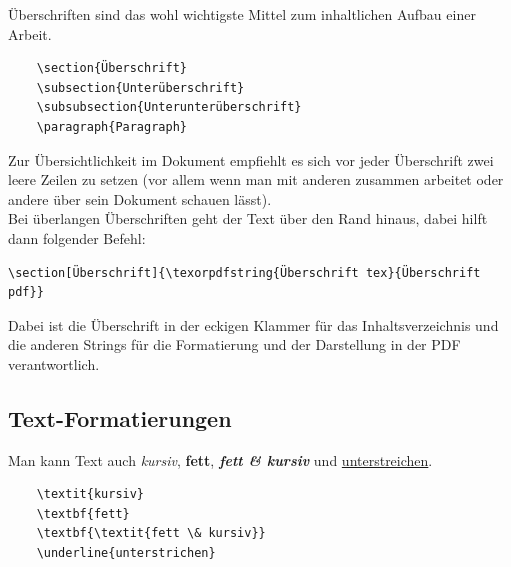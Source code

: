 Überschriften sind das wohl wichtigste Mittel zum inhaltlichen Aufbau einer Arbeit.

\begin{verbatim}
    \section{Überschrift}
    \subsection{Unterüberschrift}
    \subsubsection{Unterunterüberschrift}
    \paragraph{Paragraph}
\end{verbatim}

Zur Übersichtlichkeit im Dokument empfiehlt es sich vor jeder Überschrift zwei leere Zeilen zu setzen (vor allem wenn man mit anderen zusammen arbeitet oder andere über sein Dokument schauen lässt).\\

Bei überlangen Überschriften geht der Text über den Rand hinaus, dabei hilft dann folgender Befehl:

\begin{verbatim}
\section[Überschrift]{\texorpdfstring{Überschrift tex}{Überschrift pdf}}
\end{verbatim}

Dabei ist die Überschrift in der eckigen Klammer für das Inhaltsverzeichnis und die anderen Strings für die Formatierung und der Darstellung in der PDF verantwortlich.

\pagebreak
\subsection{Text-Formatierungen}

Man kann Text auch \textit{kursiv}, \textbf{fett}, \textbf{\textit{fett \& kursiv}} und \underline{unterstreichen}.

\begin{verbatim}
    \textit{kursiv}
    \textbf{fett}
    \textbf{\textit{fett \& kursiv}}
    \underline{unterstrichen}
\end{verbatim}

